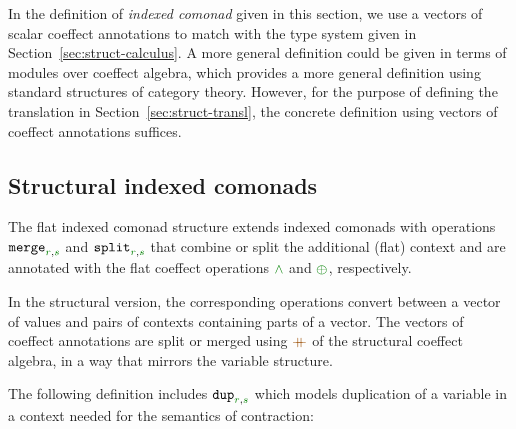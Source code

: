 In the definition of \emph{indexed comonad} given in this section, we use a vectors of scalar 
coeffect annotations to match with the type system given in Section~\ref{sec:struct-calculus}. 
A more general definition could be given in terms of modules over coeffect algebra, which
provides a more general definition using standard structures of category theory. However,
for the purpose of defining the translation in Section~\ref{sec:struct-transl}, the concrete
definition using vectors of coeffect annotations suffices.


\subsection{Structural indexed comonads}
\label{sec:struct-semantics-idxc}

The flat indexed comonad structure extends indexed comonads with operations
$\ident{merge}_{\cclrd{r},\cclrd{s}}$ and $\ident{split}_{\cclrd{r},\cclrd{s}}$ that combine or
split the additional (flat) context and are annotated with the flat coeffect operations $\czip$
and $\cpar$, respectively.

In the structural version, the corresponding operations convert between a vector
of values and pairs of contexts containing parts of a vector.
The vectors of coeffect annotations are split or merged using $\atimes$ of the structural coeffect
algebra, in a way that mirrors the variable structure.

The following definition includes $\ident{dup}_{\cclrd{r}, \cclrd{s}}$ which models
duplication of a variable in a context needed for the semantics of contraction:


